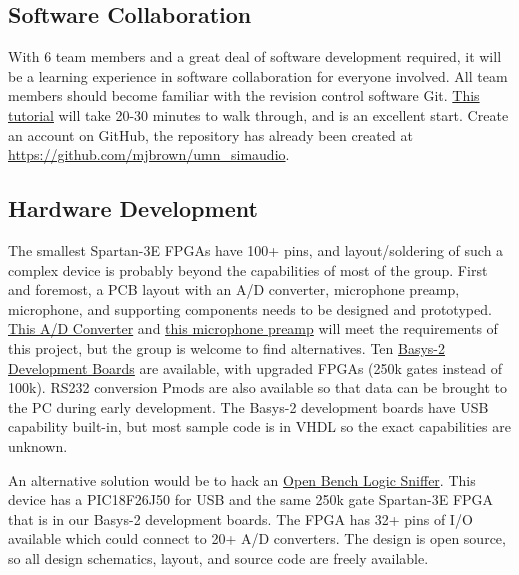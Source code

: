 \documentclass[10pt]{article}
\begin{document}
\subsection{Software Collaboration}
With 6 team members and a great deal of software development required, it will be a learning experience in software collaboration for everyone involved.  All team members should become familiar with the revision control software Git.  \href{http://www.vogella.de/articles/Git/article.html}{This tutorial} will take 20-30 minutes to walk through, and is an excellent start.  Create an account on GitHub, the repository has already been created at \href{http://github.com/mjbrown/umn\_simaudio}{https://github.com/mjbrown/umn\_simaudio}.
\subsection{Hardware Development}
The smallest Spartan-3E FPGAs have 100+ pins, and layout/soldering of such a complex device is probably beyond the capabilities of most of the group.  First and foremost, a PCB layout with an A/D converter, microphone preamp, microphone, and supporting components needs to be designed and prototyped.  \href{http://www.nxp.com/documents/data_sheet/UDA1361TS.pdf}{This A/D Converter} and \href{http://datasheets.maxim-ic.com/en/ds/MAX9812-MAX9813L.pdf}{this microphone preamp} will meet the requirements of this project, but the group is welcome to find alternatives.  Ten \href{http://www.digilentinc.com/Products/Detail.cfm?Prod=BASYS2}{Basys-2 Development Boards} are available, with upgraded FPGAs (250k gates instead of 100k).  RS232 conversion Pmods are also available so that data can be brought to the PC during early development.  The Basys-2 development boards have USB capability built-in, but most sample code is in VHDL so the exact capabilities are unknown.
\par
An alternative solution would be to hack an \href{http://dangerousprototypes.com/docs/Open_Bench_Logic_Sniffer}{Open Bench Logic Sniffer}.  This device has a PIC18F26J50 for USB and the same 250k gate Spartan-3E FPGA that is in our Basys-2 development boards.  The FPGA has 32+ pins of I/O available which could connect to 20+ A/D converters.  The design is open source, so all design schematics, layout, and source code are freely available.
\end{document}
